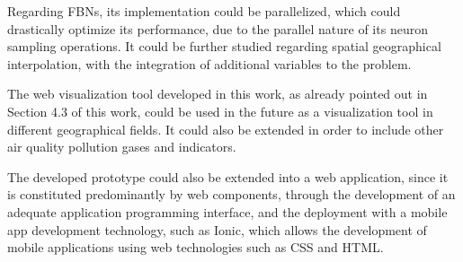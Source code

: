 Regarding FBNs, its implementation could be parallelized, which could drastically optimize its performance, due to the parallel nature of its neuron sampling operations. It could be further studied regarding spatial geographical interpolation, with the integration of additional variables to the problem.

The web visualization tool developed in this work, as already pointed out in Section 4.3 of this work, could be used in the future as a visualization tool in different geographical fields. It could also be extended in order to include other air quality pollution gases and indicators.

The developed prototype could also be extended into a web application, since it is constituted predominantly by web components, through the development of an adequate application programming interface, and the deployment with a mobile app development technology, such as Ionic, which allows the development of mobile applications using web technologies such as CSS and HTML. 

